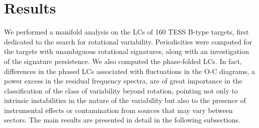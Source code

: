 \documentclass[RNAAS]{aastex63}
\begin{document}
\section{Results} \label{sec:results}

We performed a manifold analysis on the LCs of 160 TESS B-type targets, first dedicated to the search for rotational variability. Periodicities were computed for the targets with unambiguous rotational signatures, along with an investigation of the signature persistence. We also computed the phase-folded LCs. In fact, differences in the phased LCs associated with fluctuations in the O-C diagrams, a power excess in the residual frequency spectra, are of great importance in the classification of the class of variability beyond rotation, pointing not only to intrinsic instabilities in the nature of the variability but also to the presence of instrumental effects or contamination from sources that may vary between sectors. The main results are presented in detail in the following subsections.
\end{document}
